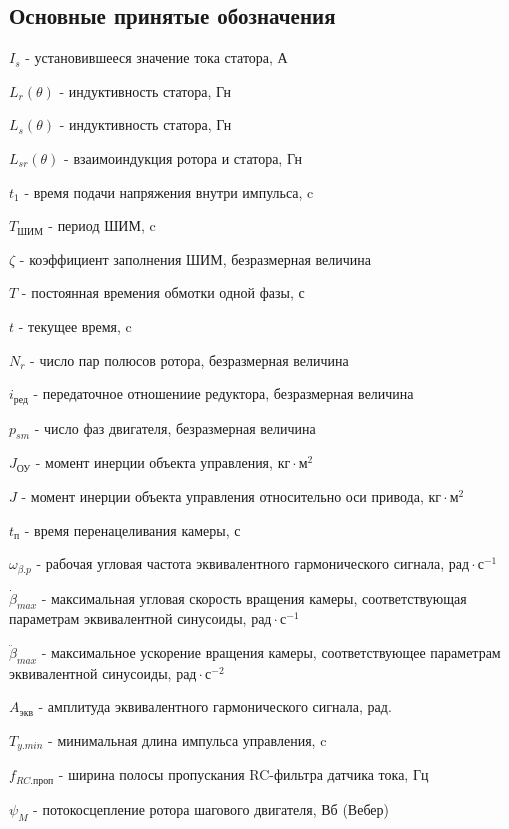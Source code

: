 \subsection{ Основные принятые обозначения }

$I_{s}$ - установившееся значение тока статора, А

$L_{r}(\theta)$ - индуктивность статора, Гн

$L_{s}(\theta)$ - индуктивность статора, Гн

$L_{sr}(\theta)$ - взаимоиндукция ротора и статора, Гн

$t_{1}$ - время подачи напряжения внутри импульса, c

$T_\text{ШИМ}$ - период ШИМ, c

$\zeta$ - коэффициент заполнения ШИМ, безразмерная величина

$T$ - постоянная времения обмотки одной фазы, с

$t$ - текущее время, c

$N_{r}$ - число пар полюсов ротора, безразмерная величина

$i_\text{ред}$ - передаточное отношениие редуктора, безразмерная величина

$p_{sm}$ - число фаз двигателя, безразмерная величина

$J_{\text{ОУ}}$ - момент инерции объекта управления, $ \text{кг} \cdot \text{м}^{2} $

$J$ - момент инерции объекта управления относительно оси привода, $ \text{кг} \cdot \text{м}^{2} $

$t_\text{п}$ - время перенацеливания камеры, с

$\omega_{\beta.p}$ - рабочая угловая частота эквивалентного гармонического сигнала,
                     $ \text{рад} \cdot \text{с}^{-1} $

$\dot{\beta}_{max}$ - максимальная угловая скорость вращения камеры, соответствующая
                      параметрам эквивалентной синусоиды, $ \text{рад} \cdot \text{с}^{-1} $

$\ddot{\beta}_{max}$ - максимальное ускорение вращения камеры, соответствующее
                       параметрам эквивалентной синусоиды, $ \text{рад} \cdot \text{с}^{-2} $

$A_\text{экв}$ - амплитуда эквивалентного гармонического сигнала, рад.

$T_{y.min}$ - минимальная длина импульса управления, c

$f_{RC.\text{проп} }$ - ширина полосы пропускания RC-фильтра датчика тока, Гц

$\psi_{M}$ - потокосцепление ротора шагового двигателя, Вб (Вебер)

